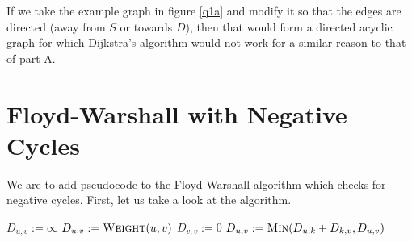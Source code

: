 \documentclass{article}
\begin{document}
If we take the example graph in figure \ref{q1a} and modify it so that the edges are directed (away from \(S\) or towards \(D\)), then that would form a directed acyclic graph for which Dijkstra's algorithm would not work for a similar reason to that of part A.

\section{Floyd-Warshall with Negative Cycles}

We are to add pseudocode to the Floyd-Warshall algorithm which checks for negative cycles. First, let us take a look at the algorithm.

\begin{algorithm}
	\begin{algorithmic}
		 
		\State \(D_{u,v} := \infty\)
		\EndFor
		 
		\State \(D_{u,v} := \Call{Weight}{u, v}\)
		\EndFor
		 
		\State \(D_{v,v} := 0\)
		\EndFor
		 
		\State \(D_{u,v} := \Call{Min}{D_{u,k} + D_{k,v}, D_{u,v}}\) 
		\EndFor
		\EndFor
		\EndFor
		\EndFunction
	\end{algorithmic}
\end{algorithm}
\end{document}
